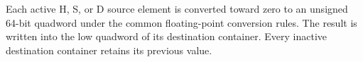 Each active H, S, or D source element is converted toward zero to an unsigned
64-bit quadword under the common floating-point conversion rules. The result
is written into the low quadword of its destination container. Every inactive
destination container retains its previous value.
